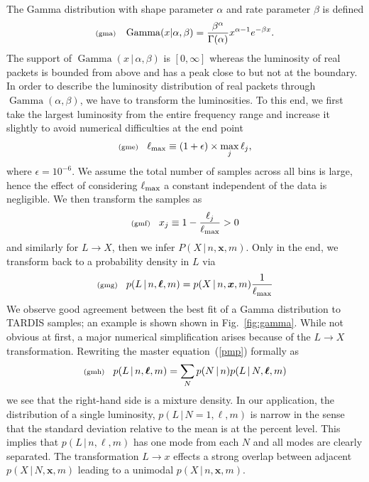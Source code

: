 \documentclass[11pt]{article}
\newcommand{\fred}[1]{\todo[inline]{#1}} %
\newcommand{\lleq}[1]{\label{#1} }
\renewcommand{\lleq}[1]{\label{#1} {\scriptstyle {\rm (#1)}} \hspace*{2ex} }
\newcommand{\cond}{\,|\,}
\newcommand{\bml}{{\bm{\ell}}}
\newcommand{\bmx}{{{\bm{x}}}}
\DeclareMathOperator{\GammaDist}{Gamma}
\newcommand{\reffig}[1]{Fig.~\ref{fig:#1}}
\newcommand{\lmax}{\ell_{\rm max}}
\begin{document}
The Gamma distribution  with shape parameter $\alpha$ and rate
parameter $\beta$ is defined
\begin{align}
  \lleq{gma}
  \GammaDist(x | \alpha, \beta) = \frac{\beta^\alpha}{\Gamma(\alpha)} x^{\alpha-1} e^{-\beta x} .
\end{align}
The support of $\GammaDist(x \cond \alpha, \beta)$ is $[0, \infty]$
whereas the luminosity of real packets is bounded from above and has a
peak close to but not at the boundary. In order to describe the luminosity
distribution of real packets through $\GammaDist(\alpha, \beta)$, we
have to transform the luminosities. To this end, we first take the
largest luminosity from the entire frequency range and increase it
slightly to avoid numerical difficulties at the end point
\begin{align}
  \lleq{gme}
  \lmax \equiv (1+\epsilon) \times \max_j \ell_j,
\end{align}
where $ \epsilon=10^{-6}$.
We assume the total number of samples across all bins is large, hence
the effect of considering $\lmax$ a constant independent of the data
is negligible. We then transform the samples as
\begin{align}
  \lleq{gmf}
  x_j \equiv 1- \frac{\ell_j}{\lmax} > 0
\end{align}
and similarly for $L \to X$, then we infer $P(X \cond n, \bmx,
m)$. Only in the end, we transform back to a probability density in
$L$ via
\begin{align}
  \lleq{gmg}
  p(L  \cond n, \bml, m) = p(X  \cond n, \bmx, m) \frac{1}{\lmax}
\end{align}
We observe good agreement between the best fit of a Gamma distribution
to TARDIS samples; an example is shown shown in \reffig{gamma}.  While
not obvious at first, a major numerical simplification arises because
of the $L \to X$ transformation. Rewriting the master
equation~(\ref{pmp}) formally as
\begin{align}
  \lleq{gmh}
  p(L  \cond n, \bml, m) = \sum_{N} p(N \cond n) p(L \cond N, \bml, m)
\end{align}
we see that the right-hand side is a mixture density. In our
application, the distribution of a single luminosity, $p(L \cond N=1,
\bml, m)$ is narrow in the sense that the standard deviation relative
to the mean is at the percent level. This implies that $p(L \cond n,
\bml, m)$ has one mode from each $N$ and all modes are clearly
separated. The transformation $L \to x$ effects a strong overlap
between adjacent $p(X \cond N, \bmx, m)$ leading to a unimodal $p(X
\cond n, \bmx, m)$.  \fred{Show plot: from hedgehog to single peak}
\end{document}
